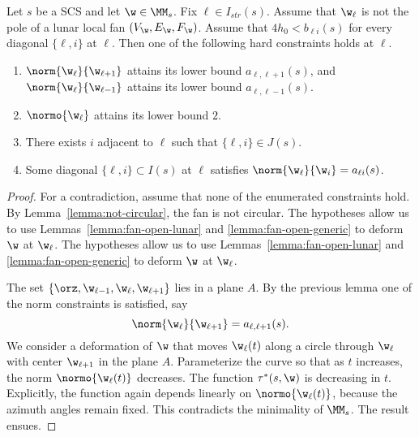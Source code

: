 \begin{lemma}\label{lemma:imj2}
Let $s$ be a SCS and let $\w\in \MM_s$.   Fix $\ell\in I_{str}(s)$.  
Assume  that $\w_\ell$ is not the pole of a lunar local fan $(V_\w,E_\w,F_\w)$.
Assume that $4h_0 < b_{\ell i}(s)$ for every diagonal $\{\ell,i\}$ at $\ell$.
Then one of the following hard constraints holds at $\ell$.
\begin{enumerate}
\item $\norm{\w_\ell}{\w_{\ell+1}}$ attains its lower bound $a_{\ell,\ell+1}(s)$, and
 $\norm{\w_\ell}{\w_{\ell-1}}$ attains its lower bound $a_{\ell,\ell-1}(s)$.
\item $\normo{\w_\ell}$ attains its lower bound $2$.
\item There exists $i$ adjacent to $\ell$ such that $\{\ell,i\}\in J(s)$.
\item Some diagonal $\{\ell,i\}\subset I(s)$ at $\ell$ satisfies
$\norm{\w_\ell}{\w_i}=a_{\ell i}(s)$.
\end{enumerate}
\end{lemma}

\begin{proof} 
For a contradiction, assume that none of the enumerated constraints hold.
By Lemma~\ref{lemma:not-circular}, the fan is not circular.
The hypotheses
allow us to use Lemmas~\ref{lemma:fan-open-lunar} and
\ref{lemma:fan-open-generic} to deform $\w$ at $\w_\ell$.
The hypotheses
allow us to use Lemmas~\ref{lemma:fan-open-lunar} and
\ref{lemma:fan-open-generic} to deform $\w$ at $\w_\ell$.

The set $\{\orz,\w_{\ell-1},\w_\ell,\w_{\ell+1}\}$ lies in a plane $A$.
By the previous
lemma one of the norm constraints is satisfied, say
\[
\norm{\w_\ell}{\w_{\ell+1}}=a_{\ell,\ell+1}(s).
\]
We consider a  deformation of $\w$ that moves
 $\w_\ell(t)$ along a circle through
 $\w_\ell$ with center $\w_{\ell+1}$ in the plane $A$.  Parameterize the curve
so that as $t$ increases, the norm $\normo{\w_\ell(t)}$ decreases.
The function $\tau^*(s,\w)$ is decreasing in $t$.  Explicitly, the
function again depends linearly on $\normo{\w_\ell(t)}$, because
the azimuth angles remain fixed.  This contradicts the minimality of
$\MM_s$. 
The result ensues.
\end{proof}

